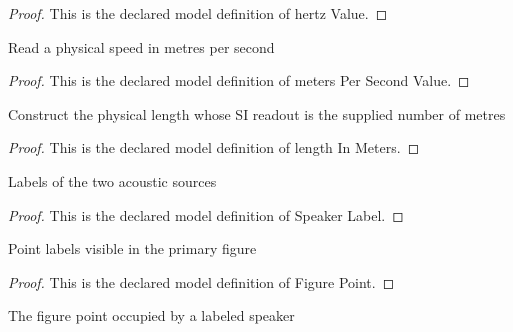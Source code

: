 \begin{proof}
  This is the declared model definition of hertz Value.
\end{proof}
\begin{definition}
  \label{def:physics:phyx-mini-0169:phyxminiproblems-problemphyxmini0169-meterspersecondvalue}
  Read a physical speed in metres per second
\end{definition}
\begin{proof}
  This is the declared model definition of meters Per Second Value.
\end{proof}
\begin{definition}
  \label{def:physics:phyx-mini-0169:phyxminiproblems-problemphyxmini0169-lengthinmeters}
  Construct the physical length whose SI readout is the supplied number of metres
\end{definition}
\begin{proof}
  This is the declared model definition of length In Meters.
\end{proof}
\begin{definition}
  \label{def:physics:phyx-mini-0169:phyxminiproblems-problemphyxmini0169-speakerlabel}
  Labels of the two acoustic sources
\end{definition}
\begin{proof}
  This is the declared model definition of Speaker Label.
\end{proof}
\begin{definition}
  \label{def:physics:phyx-mini-0169:phyxminiproblems-problemphyxmini0169-figurepoint}
  Point labels visible in the primary figure
\end{definition}
\begin{proof}
  This is the declared model definition of Figure Point.
\end{proof}
\begin{definition}
  \label{def:physics:phyx-mini-0169:phyxminiproblems-problemphyxmini0169-speakerlabel-figurepoint}
  The figure point occupied by a labeled speaker
\end{definition}
